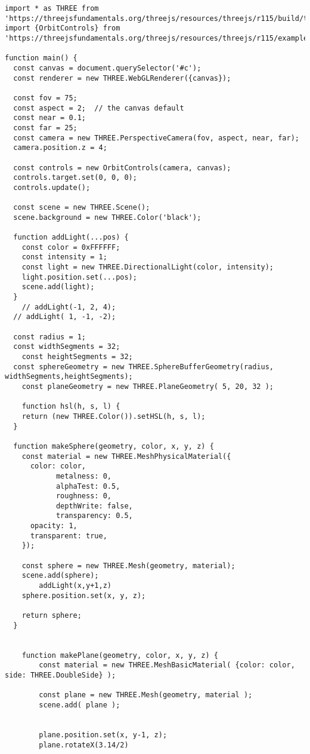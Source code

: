 \documentclass{article}
\begin{document}
\begin{verbatim}
import * as THREE from 'https://threejsfundamentals.org/threejs/resources/threejs/r115/build/three.module.js';
import {OrbitControls} from 'https://threejsfundamentals.org/threejs/resources/threejs/r115/examples/jsm/controls/OrbitControls.js';

function main() {
  const canvas = document.querySelector('#c');
  const renderer = new THREE.WebGLRenderer({canvas});

  const fov = 75;
  const aspect = 2;  // the canvas default
  const near = 0.1;
  const far = 25;
  const camera = new THREE.PerspectiveCamera(fov, aspect, near, far);
  camera.position.z = 4;

  const controls = new OrbitControls(camera, canvas);
  controls.target.set(0, 0, 0);
  controls.update();

  const scene = new THREE.Scene();
  scene.background = new THREE.Color('black');

  function addLight(...pos) {
    const color = 0xFFFFFF;
    const intensity = 1;
    const light = new THREE.DirectionalLight(color, intensity);
    light.position.set(...pos);
    scene.add(light);
  }
	// addLight(-1, 2, 4);
  // addLight( 1, -1, -2);

  const radius = 1;
  const widthSegments = 32;
	const heightSegments = 32;
  const sphereGeometry = new THREE.SphereBufferGeometry(radius, widthSegments,heightSegments);
	const planeGeometry = new THREE.PlaneGeometry( 5, 20, 32 );

	function hsl(h, s, l) {
    return (new THREE.Color()).setHSL(h, s, l);
  }

  function makeSphere(geometry, color, x, y, z) {
    const material = new THREE.MeshPhysicalMaterial({
      color: color,
			metalness: 0,
			alphaTest: 0.5,
			roughness: 0,
			depthWrite: false,
			transparency: 0.5,
      opacity: 1,
      transparent: true,
    });

    const sphere = new THREE.Mesh(geometry, material);
    scene.add(sphere);
		addLight(x,y+1,z)
    sphere.position.set(x, y, z);

    return sphere;
  }


	function makePlane(geometry, color, x, y, z) {
		const material = new THREE.MeshBasicMaterial( {color: color, side: THREE.DoubleSide} );

		const plane = new THREE.Mesh(geometry, material );
		scene.add( plane );


		plane.position.set(x, y-1, z);
		plane.rotateX(3.14/2)


\end{verbatim}
\end{document}
